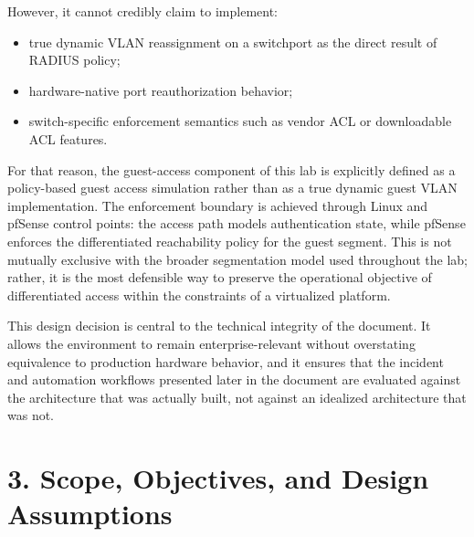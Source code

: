 \documentclass[11pt]{article}
\begin{document}
However, it cannot credibly claim to implement:

\begin{itemize}
    \item true dynamic VLAN reassignment on a switchport as the direct result of RADIUS policy;
    \item hardware-native port reauthorization behavior;
    \item switch-specific enforcement semantics such as vendor ACL or downloadable ACL features.
\end{itemize}

For that reason, the guest-access component of this lab is explicitly defined as a policy-based guest access simulation rather than as a true dynamic guest VLAN implementation. The enforcement boundary is achieved through Linux and pfSense control points: the access path models authentication state, while pfSense enforces the differentiated reachability policy for the guest segment. This is not mutually exclusive with the broader segmentation model used throughout the lab; rather, it is the most defensible way to preserve the operational objective of differentiated access within the constraints of a virtualized platform.

This design decision is central to the technical integrity of the document. It allows the environment to remain enterprise-relevant without overstating equivalence to production hardware behavior, and it ensures that the incident and automation workflows presented later in the document are evaluated against the architecture that was actually built, not against an idealized architecture that was not.


\section{3. Scope, Objectives, and Design Assumptions}
\label{sec:scope-objectives-and-design-assumptions}

\end{document}
